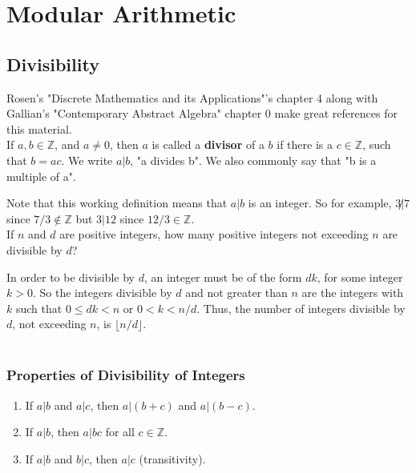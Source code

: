 \section{Modular Arithmetic}



\subsection{Divisibility}

Rosen's "Discrete Mathematics and its Applications"'s chapter 4 along with Gallian's "Contemporary
Abstract Algebra" chapter 0 make great references for this material.
\\

If $a,b \in \mathbb{Z}$,
and $a \neq 0$,
then $a$ is called a \textbf{divisor}
of a $b$
if there is a $c\in\mathbb{Z}$, such that $b = ac$.
We write $a|b$, "a divides b". We also commonly say that "b is a multiple of a".

Note that this working definition means that $a|b$ is an integer.
So for example, $3\not| 7$ since $7 / 3 \notin \mathbb{Z}$ but $3|12$ since $12/3 \in \mathbb{Z}$.
\\

If $n$ and $d$ are positive integers, how many positive integers not exceeding $n$ are divisible by $d$?

In order to be divisible by $d$, an integer must be of the form $dk$, for some integer $k>0$.
So the integers divisible by $d$ and not greater than $n$ are the integers with $k$ such that
$0 \leq dk < n$
or $0 < k < n/d$.
Thus, the number of integers divisible by $d$, not exceeding $n$, is $\lfloor n / d \rfloor$.
\\~\\


\subsubsection{Properties of Divisibility of Integers}

\begin{enumerate}
    \item If $a|b$ and $a|c$, then $a|(b+c)$ and $a|(b-c)$. \label{divisibility:p1}
    \item If $a|b$, then $a|bc$ for all $c\in\mathbb{Z}$. \label{divisibility:p2}
    \item If $a|b$ and $b|c$, then $a|c$ (transitivity).
\end{enumerate}


